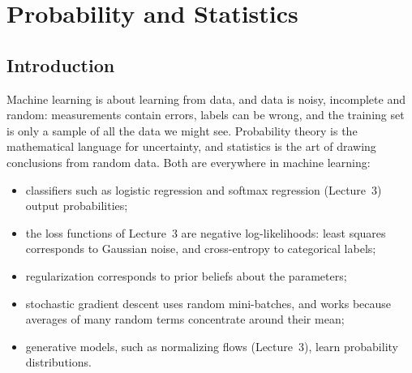 \chapter{Probability and Statistics}\label{L4-chapter}
\begingroup
\section*{Introduction}

Machine learning is about learning from data, and data is noisy, incomplete and random: measurements contain errors, labels can be wrong, and the training set is only a sample of all the data we might see. Probability theory is the mathematical language for uncertainty, and statistics is the art of drawing conclusions from random data. Both are everywhere in machine learning:
\begin{itemize}
    \item classifiers such as logistic regression and softmax regression (Lecture~3) output probabilities;
    \item the loss functions of Lecture~3 are negative log-likelihoods: least squares corresponds to Gaussian noise, and cross-entropy to categorical labels;
    \item regularization corresponds to prior beliefs about the parameters;
    \item stochastic gradient descent uses random mini-batches, and works because averages of many random terms concentrate around their mean;
    \item generative models, such as normalizing flows (Lecture~3), learn probability distributions.
\end{itemize}
